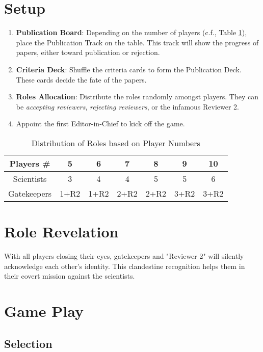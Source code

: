 \documentclass[sigplan,screen,nonacm]{acmart}
\begin{document}
\section{Setup}

\begin{enumerate}
	\item \textbf{Publication Board}: Depending on the number of players (c.f., Table \ref{tab:role_distribution}), place the Publication Track on the table. This track will show the progress of papers, either toward publication or rejection.
	\item \textbf{Criteria Deck}: Shuffle the criteria cards to form the Publication Deck. These cards decide the fate of the papers.
	\item \textbf{Roles Allocation}: Distribute the roles randomly amongst players. They can be \textit{accepting reviewers}, \textit{rejecting reviewers}, or the infamous Reviewer 2.
	\item Appoint the first Editor-in-Chief to kick off the game.
\end{enumerate}

\begin{table}[h]
	\centering
	\begin{tabular}{|c|c|c|c|c|c|c|}
		\hline
		\textbf{Players \#} & 5 & 6 & 7 & 8 & 9 & 10 \\
		\hline
		Scientists & 3 & 4 & 4 & 5 & 5 & 6 \\
		\hline
		Gatekeepers & 1+R2 & 1+R2 & 2+R2 & 2+R2 & 3+R2 & 3+R2 \\
		\hline
	\end{tabular}
	\caption{Distribution of Roles based on Player Numbers}
	\label{tab:role_distribution}
\end{table}


\section{Role Revelation}

With all players closing their eyes, gatekeepers and "Reviewer 2" will silently acknowledge each other's identity. This clandestine recognition helps them in their covert mission against the scientists.

\section{Game Play}

\subsection{Selection}
\end{document}
